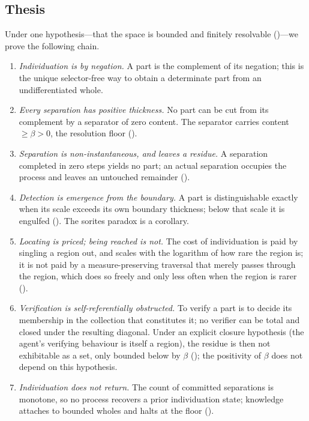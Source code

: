 \documentclass[11pt,a4paper]{article}
\theoremstyle{thmstyle}
\theoremstyle{definition}
\theoremstyle{remark}
\newcommand{\thick}{\beta}
\begin{document}
\subsection{Thesis}

Under one hypothesis---that the space is bounded and finitely resolvable
()---we prove the following chain.

\begin{enumerate}[label=(\roman*),leftmargin=2.2em]
\item \emph{Individuation is by negation.} A part is the complement of its
negation; this is the unique selector-free way to obtain a determinate part
from an undifferentiated whole.
\item \emph{Every separation has positive thickness.} No part can be cut from
its complement by a separator of zero content. The separator carries content
$\ge\thick>0$, the resolution floor ().
\item \emph{Separation is non-instantaneous, and leaves a residue.} A
separation completed in zero steps yields no part; an actual separation
occupies the process and leaves an untouched remainder
().
\item \emph{Detection is emergence from the boundary.} A part is
distinguishable exactly when its scale exceeds its own boundary thickness;
below that scale it is engulfed (). The sorites paradox is a
corollary.
\item \emph{Locating is priced; being reached is not.} The cost of
individuation is paid by singling a region out, and scales with the logarithm of
how rare the region is; it is not paid by a measure-preserving traversal that
merely passes through the region, which does so freely and only less often when
the region is rarer ().
\item \emph{Verification is self-referentially obstructed.} To verify a part
is to decide its membership in the collection that constitutes it; no verifier can
be total and closed under the resulting diagonal. Under an explicit closure
hypothesis (the agent's verifying behaviour is itself a region), the residue is
then not exhibitable as a set, only bounded below by $\thick$
(); the positivity of $\thick$ does not depend on this
hypothesis.
\item \emph{Individuation does not return.} The count of committed separations
is monotone, so no process recovers a prior individuation state; knowledge
attaches to bounded wholes and halts at the floor ().
\end{enumerate}
\end{document}
